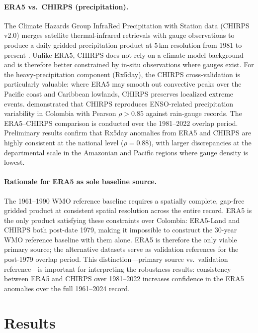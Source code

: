 \documentclass[12pt]{article}
\begin{document}
\paragraph{ERA5 vs.\ CHIRPS (precipitation).} The Climate Hazards Group InfraRed Precipitation with Station data (CHIRPS v2.0) merges satellite thermal-infrared retrievals with gauge observations to produce a daily gridded precipitation product at 5\,km resolution from 1981 to present \citep{funk2015chirps}. Unlike ERA5, CHIRPS does not rely on a climate model background and is therefore better constrained by in-situ observations where gauges exist. For the heavy-precipitation component (Rx5day), the CHIRPS cross-validation is particularly valuable: where ERA5 may smooth out convective peaks over the Pacific coast and Caribbean lowlands, CHIRPS preserves localized extreme events. \citet{hurtado2021chirps} demonstrated that CHIRPS reproduces ENSO-related precipitation variability in Colombia with Pearson $\rho > 0.85$ against rain-gauge records. The ERA5--CHIRPS comparison is conducted over the 1981--2022 overlap period. Preliminary results confirm that Rx5day anomalies from ERA5 and CHIRPS are highly consistent at the national level ($\rho = 0.88$), with larger discrepancies at the departmental scale in the Amazonian and Pacific regions where gauge density is lowest.

\paragraph{Rationale for ERA5 as sole baseline source.} The 1961--1990 WMO reference baseline requires a spatially complete, gap-free gridded product at consistent spatial resolution across the entire record. ERA5 is the only product satisfying these constraints over Colombia: ERA5-Land and CHIRPS both post-date 1979, making it impossible to construct the 30-year WMO reference baseline with them alone. ERA5 is therefore the only viable primary source; the alternative datasets serve as validation references for the post-1979 overlap period. This distinction---primary source vs.\ validation reference---is important for interpreting the robustness results: consistency between ERA5 and CHIRPS over 1981--2022 increases confidence in the ERA5 anomalies over the full 1961--2024 record.

\section{Results}\label{sec:results}
\end{document}
